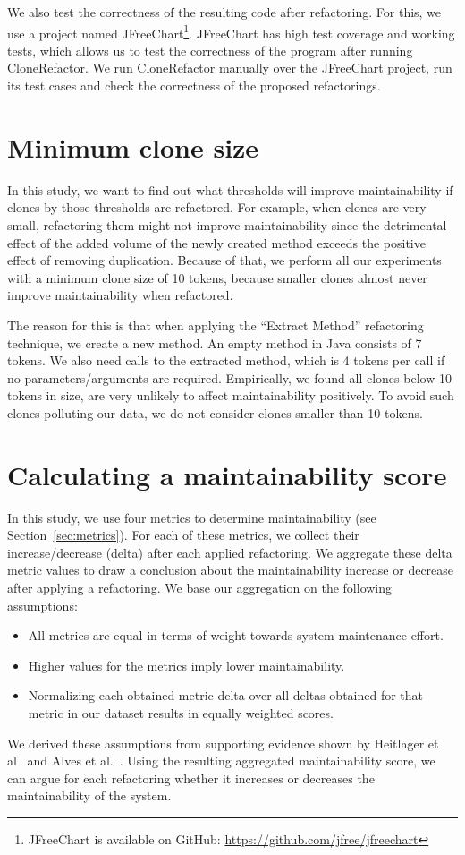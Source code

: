 We also test the correctness of the resulting code after refactoring. For this, we use a project named JFreeChart\footnote{JFreeChart is available on GitHub: \url{https://github.com/jfree/jfreechart}}. JFreeChart has high test coverage and working tests, which allows us to test the correctness of the program after running CloneRefactor. We run CloneRefactor manually over the JFreeChart project, run its test cases and check the correctness of the proposed refactorings.

\section{Minimum clone size}
In this study, we want to find out what thresholds will improve maintainability if clones by those thresholds are refactored. For example, when clones are very small, refactoring them might not improve maintainability since the detrimental effect of the added volume of the newly created method exceeds the positive effect of removing duplication. Because of that, we perform all our experiments with a minimum clone size of 10 tokens, because smaller clones almost never improve maintainability when refactored.

The reason for this is that when applying the ``Extract Method'' refactoring technique, we create a new method. An empty method in Java consists of 7 tokens. We also need calls to the extracted method, which is 4 tokens per call if no parameters/arguments are required. Empirically, we found all clones below 10 tokens in size, are very unlikely to affect maintainability positively. To avoid such clones polluting our data, we do not consider clones smaller than 10 tokens.

\section{Calculating a maintainability score}\label{sec:metricformula}
In this study, we use four metrics to determine maintainability (see Section~\ref{sec:metrics}). For each of these metrics, we collect their increase/decrease (delta) after each applied refactoring. We aggregate these delta metric values to draw a conclusion about the maintainability increase or decrease after applying a refactoring. We base our aggregation on the following assumptions:
\begin{itemize}
  \item All metrics are equal in terms of weight towards system maintenance effort.
  \item Higher values for the metrics imply lower maintainability.
  \item Normalizing each obtained metric delta over all deltas obtained for that metric in our dataset results in equally weighted scores.
\end{itemize}
We derived these assumptions from supporting evidence shown by Heitlager et al~\cite{heitlager2007practical} and Alves et al.~\cite{alves2010deriving}. Using the resulting aggregated maintainability score, we can argue for each refactoring whether it increases or decreases the maintainability of the system.

